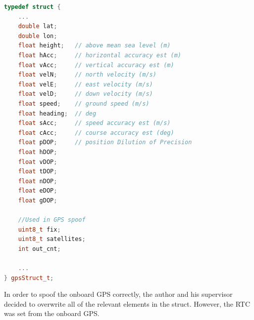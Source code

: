 \begin{lstlisting}[language = c++, caption = Quality checks added to discard bad positions, label=code:gpsData_Struct]
typedef struct {
	...
    double lat;
    double lon;
    float height;   // above mean sea level (m)
    float hAcc;     // horizontal accuracy est (m)
    float vAcc;     // vertical accuracy est (m)
    float velN;     // north velocity (m/s)
    float velE;     // east velocity (m/s)
    float velD;     // down velocity (m/s)
    float speed;    // ground speed (m/s)
    float heading;  // deg
    float sAcc;     // speed accuracy est (m/s)
    float cAcc;     // course accuracy est (deg)
    float pDOP;     // position Dilution of Precision
    float hDOP;
    float vDOP;
    float tDOP;
    float nDOP;
    float eDOP;
    float gDOP;

    //Used in GPS spoof
    uint8_t fix;
    uint8_t satellites;
    int out_cnt;

	...
} gpsStruct_t;
\end{lstlisting}


In order to spoof the onboard GPS correctly, the author and his supervisor decided to overwrite all of the relevant elements in the struct. However, the RTC was set from the onboard GPS.

